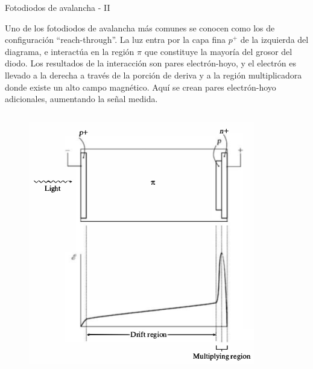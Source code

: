 \documentclass[a4paper,10pt]{beamer}
\begin{document}
\begin{frame}{Fotodiodos de avalancha - II}
\begin{justify}
\footnotesize
 Uno de los fotodiodos de avalancha más comunes se conocen como los de configuración 
 ``reach-through''. La luz entra por la capa fina $p^+$ de la izquierda del diagrama, 
 e interactúa en la región $\pi$ que constituye la mayoría del grosor del diodo. Los 
 resultados de la interacción son pares electrón-hoyo, y el electrón es llevado 
 a la derecha a través de la porción de deriva y a la región multiplicadora donde 
 existe un alto campo magnético. Aquí se crean pares electrón-hoyo adicionales, aumentando 
 la señal medida.
\end{justify} 
 
\begin{columns}[c]
 
 \column{2in}
 \begin{figure}
  \center 
  \includegraphics[scale=0.33]{fig41}
 \end{figure}

 \column{2.5in}
 

\end{columns}
\end{frame}
\end{document}
